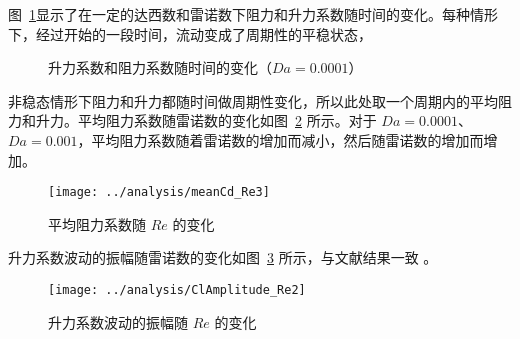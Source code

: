 图~\ref{fig: ClCd_t-1e-4}显示了在一定的达西数和雷诺数下阻力和升力系数随时间的变化。每种情形下，经过开始的一段时间，流动变成了周期性的平稳状态，

\begin{figure}
	\setlength{\subfigcapskip}{-1bp}
	\centering
	\begin{minipage}{\textwidth}
		\centering
	\end{minipage}
	\centering
	\begin{minipage}{\textwidth}
		\centering
	\end{minipage}
	\centering
	\begin{minipage}{\textwidth}
		\centering
	\end{minipage}
	\centering
	\begin{minipage}{\textwidth}
		\centering
	\end{minipage}
	\vspace{0.2em}
	\caption{升力系数和阻力系数随时间的变化（$Da=0.0001$）}
	\label{fig: ClCd_t-1e-4}
\end{figure}

非稳态情形下阻力和升力都随时间做周期性变化，所以此处取一个周期内的平均阻力和升力。平均阻力系数随雷诺数的变化如图~\ref{fig: meanCd} 所示。对于 $Da=0.0001$、$Da=0.001$，平均阻力系数随着雷诺数的增加而减小，然后随雷诺数的增加而增加。

\begin{figure}
	\centering
	\texttt{[image: ../analysis/meanCd\_Re3]}
	\caption{平均阻力系数随 $Re$ 的变化}
	\label{fig: meanCd}
\end{figure}

升力系数波动的振幅随雷诺数的变化如图~\ref{fig: ClAmplitude} 所示，与文献结果一致 \cite{Park1998}。

\begin{figure}
	\centering
	\texttt{[image: ../analysis/ClAmplitude\_Re2]}
	\caption{升力系数波动的振幅随 $Re$ 的变化}
	\label{fig: ClAmplitude}
\end{figure}

